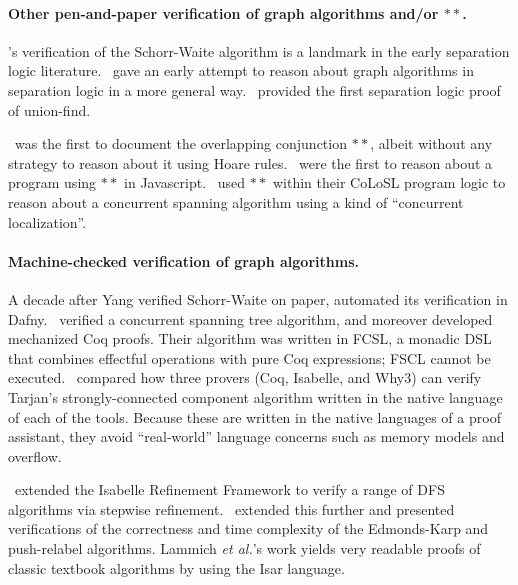 \paragraph{Other pen-and-paper verification of graph algorithms and/or $**$.}

\cite{hongseok:phd}’s verification of the Schorr-Waite algorithm is 
a landmark in the early separation logic literature. 
\cite{bornat:aliasing04}~gave an early attempt to reason about graph algorithms 
in separation logic in a more general way. 
\cite{neelthesis}~provided the first separation logic proof of union-find.

\cite{rey-slnotes}~was the first to document the overlapping 
conjunction $**$, albeit without any strategy to reason about it using Hoare rules. 
\cite{gardnerms12}~were the first to reason about a program using $**$ in 
Javascript. 
\cite{raadvg15}~used $**$ within their CoLoSL program logic to reason about 
a concurrent spanning algorithm using a kind of ``concurrent localization''.


\paragraph{Machine-checked verification of graph algorithms.}
A decade after Yang verified Schorr-Waite on paper, \cite{leino10} automated 
its verification in Dafny. 
\cite{ilya-graphs}~verified a concurrent spanning tree algorithm, and 
moreover developed mechanized Coq proofs. Their algorithm was written in FCSL, 
a monadic DSL that combines effectful operations with pure Coq expressions; 
FSCL cannot be executed. 
\cite{chen18}~compared how three provers (Coq, Isabelle, and Why3) can 
verify Tarjan’s strongly-connected component algorithm written in the native 
language of each of the tools. Because these are written in the native languages 
of a proof assistant, they avoid “real-world” language concerns such as 
memory models and overflow.

\cite{lamneu15}~extended the Isabelle Refinement Framework to verify a range of 
DFS algorithms via stepwise refinement. 
\cite{lamsef19}~extended this further and presented verifications of 
the correctness and time complexity of the Edmonds-Karp and push-relabel
algorithms. Lammich \emph{et al.}’s work yields very readable proofs of classic 
textbook algorithms by using the Isar language.

